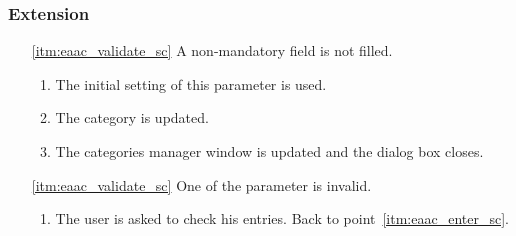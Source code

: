 \subsubsection{Extension}
\begin{enumerate}
	\item[\ref{itm:eaac_validate_sc}] A non-mandatory field is not filled.
	\begin{enumerate}[i]
		\item The initial setting of this parameter is used. 
		\item The category is updated.
		\item The categories manager window is updated and the dialog box closes.
	\end{enumerate}
	
	\item[\ref{itm:eaac_validate_sc}] One of the parameter is invalid.
	\begin{enumerate}[i]
		\item The user is asked to check his entries. Back to point~\ref{itm:eaac_enter_sc}.
	\end{enumerate}
\end{enumerate}
